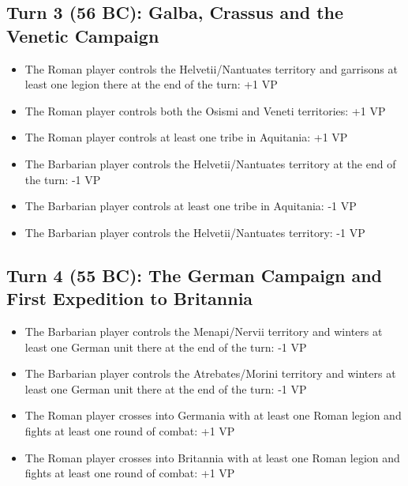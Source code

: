 \subsection{Turn 3 (56 BC): Galba, Crassus and the Venetic Campaign}
\begin{itemize}
  \setlength\itemsep{0em}
  \item The Roman player controls the Helvetii/Nantuates territory and garrisons at least one legion there at the end of the turn: +1 VP
  \item The Roman player controls both the Osismi and Veneti territories: +1 VP
  \item The Roman player controls at least one tribe in Aquitania: +1 VP
  \item The Barbarian player controls the Helvetii/Nantuates territory at the end of the turn: -1 VP
  \item The Barbarian player controls at least one tribe in Aquitania: -1 VP
  \item The Barbarian player controls the Helvetii/Nantuates territory: -1 VP
\end{itemize}

\subsection{Turn 4 (55 BC): The German Campaign and First Expedition to Britannia}
\begin{itemize}
  \setlength\itemsep{0em}
  \item The Barbarian player controls the Menapi/Nervii territory and winters at least one German unit there at the end of the turn: -1 VP
  \item The Barbarian player controls the Atrebates/Morini territory and winters at least one German unit there at the end of the turn: -1 VP
  \item The Roman player crosses into Germania with at least one Roman legion and fights at least one round of combat: +1 VP
  \item The Roman player crosses into Britannia with at least one Roman legion and fights at least one round of combat: +1 VP
\end{itemize}

